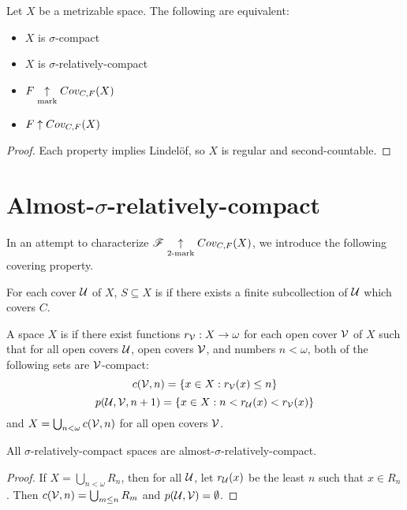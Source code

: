 \begin{cor}
  Let $X$ be a metrizable space. The following are equivalent:
  \begin{itemize}
    \item $X$ is $\sigma$-compact
    \item $X$ is $\sigma$-relatively-compact
    \item $F \underset{\text{mark}}{\uparrow} Cov_{C,F}(X)$
    \item $F \uparrow Cov_{C,F}(X)$
  \end{itemize}
\end{cor}

\begin{proof}
  Each property implies Lindel\"of, so $X$ is regular and second-countable.
\end{proof}

\section{Almost-$\sigma$-relatively-compact}

In an attempt to characterize $\mathscr{F}\underset{2\text{-mark}}{\uparrow}Cov_{C,F}(X)$, we introduce the
following covering property.

\begin{defn}
  For each cover $\mathcal{U}$ of $X$, $S\subseteq X$ is  if
  there exists a finite subcollection of $\mathcal{U}$ which covers $C$.

  A space $X$ is  if there exist
  functions $r_{\mathcal{V}}:X\to\omega$ for each open cover $\mathcal{V}$ of $X$ such that
  for all open covers $\mathcal{U}$, open covers $\mathcal{V}$, and numbers $n<\omega$,
  both of the following sets are $\mathcal{V}$-compact:
    \[
      c(\mathcal{V},n)=\{ x\in X : r_{\mathcal{V}}(x)\leq n\}
    \]
    \[
      p(\mathcal{U},\mathcal{V},n+1)=\{ x\in X : n<r_{\mathcal{U}}(x)<r_{\mathcal{V}}(x)\}
    \]
  and $X = \bigcup_{n<\omega} c(\mathcal{V},n)$ for all open covers $\mathcal{V}$.
\end{defn}

\begin{prop}
  All $\sigma$-relatively-compact spaces are almost-$\sigma$-relatively-compact.
\end{prop}

\begin{proof}
  If $X=\bigcup_{n<\omega}R_n$, then for all $\mathcal{U}$, let $r_{\mathcal{U}}(x)$ be the
  least $n$ such that $x\in R_n$. Then $c(\mathcal{V},n)=\bigcup_{m\leq n}R_m$ and
  $p(\mathcal{U},\mathcal{V}) = \emptyset$.
\end{proof}

